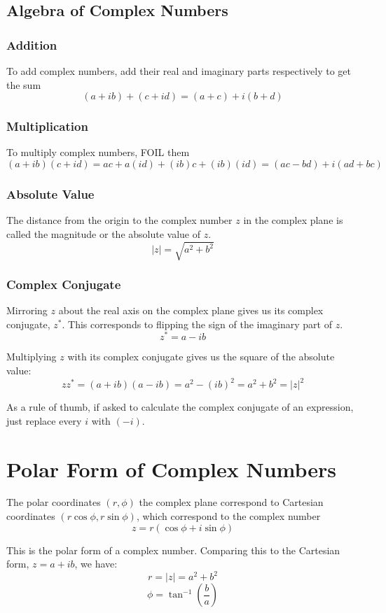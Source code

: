 \subsection{Algebra of Complex Numbers}
\subsubsection{Addition}
To add complex numbers, add their real and imaginary parts respectively to get the sum
\[ (a+ib) + (c+id) = (a+c) + i(b+d) \]
\subsubsection{Multiplication}
To multiply complex numbers, FOIL them
\[ (a+ib)(c+id) = ac + a(id) + (ib)c + (ib)(id) = (ac-bd) + i(ad + bc) \]
\subsubsection{Absolute Value}
The distance from the origin to the complex number \(z\) in the complex plane is called the magnitude 
or the absolute value of \(z\).
\[ |z| = \sqrt{a^2 + b^2} \]
\subsubsection{Complex Conjugate}
Mirroring \(z\) about the real axis on the complex plane gives us its complex conjugate, \(z^*\). This 
corresponds to flipping the sign of the imaginary part of \(z\).
\[ z^* = a - ib \]

Multiplying \(z\) with its complex conjugate gives us the square of the absolute value:
\[ zz^* = (a+ib)(a-ib) = a^2 - (ib)^2 = a^2 + b^2 = |z|^2 \]

As a rule of thumb, if asked to calculate the complex conjugate of an expression, just replace every
\(i\) with \((-i)\).

\section{Polar Form of Complex Numbers}
The polar coordinates \((r,\phi)\) the complex plane correspond to Cartesian coordinates
\((r\cos\phi, r\sin\phi)\), which correspond to the complex number 
\[ z = r(\cos\phi + i\sin\phi) \]

This is the polar form of a complex number. Comparing this to the Cartesian form,
\(z = a+ib\), we have:
\[ r = |z| = a^2 + b^2 \]
\[ \phi = \tan^{-1}\left(\frac{b}{a}\right) \]

